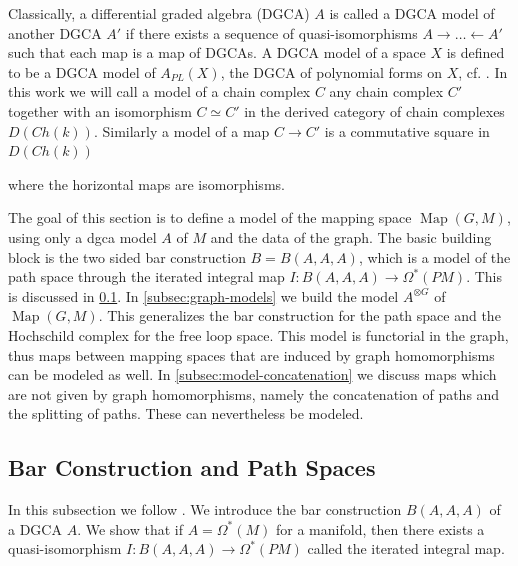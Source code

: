 \documentclass{scrartcl}
\theoremstyle{plain}
\theoremstyle{definition}
\newcommand{\quiso}{\simeq}
\newcommand{\from}{\leftarrow}
\DeclareMathOperator{\Map}{Map}
\begin{document}
Classically, a differential graded algebra (DGCA) $A$ is called a DGCA model of another DGCA $A'$ if there exists a sequence of quasi-isomorphisms $A\to\dots\from A'$ such that each map is a map of DGCAs. A DGCA model of a space $X$ is defined to be a DGCA model of $A_{PL}(X)$, the DGCA of polynomial forms on $X$, cf. \cite[ch. 10]{felix2012rational}. In this work we will call a model of a chain complex $C$ any chain complex $C'$ together with an isomorphism $C\quiso C'$ in the derived category of chain complexes $D(Ch(k))$. Similarly a model of a map $C\to C'$ is a commutative square in $D(Ch(k))$
\begin{center}
\end{center}
where the horizontal maps are isomorphisms. 

The goal of this section is to define a model of the mapping space $\Map(G, M)$, using only a dgca model $A$ of $M$ and the data of the graph. The basic building block is the two sided bar construction $B=B(A, A, A)$, which is a model of the path space through the iterated integral map $I\colon B(A, A, A)\to\Omega^*(PM)$. This is discussed in \cref{subsec:model-path-space}. In \cref{subsec:graph-models} we build the model $A^{\otimes G}$ of $\Map(G, M)$. This generalizes the bar construction for the path space and the Hochschild complex for the free loop space. This model is functorial in the graph, thus maps between mapping spaces that are induced by graph homomorphisms can be modeled as well. In \cref{subsec:model-concatenation} we discuss maps which are not given by graph homomorphisms, namely the concatenation of paths and the splitting of paths. These can nevertheless be modeled. 


\subsection{Bar Construction and Path Spaces}\label{subsec:model-path-space}

In this subsection we follow \cite{naef2019string}. We introduce the bar construction $B(A, A, A)$ of a DGCA $A$. We show that if $A=\Omega^*(M)$ for a manifold, then there exists a quasi-isomorphism $I\colon B(A, A, A)\to \Omega^*(PM)$ called the iterated integral map. %
\end{document}
